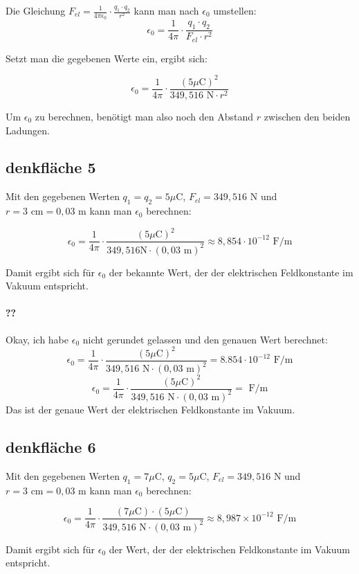 \documentclass{report}
\begin{document}
Die Gleichung $F_{el}=\frac{1}{4\pi\epsilon_0} \cdot \frac{q_1 \cdot q_2}{r^2}$
kann man nach $\epsilon_0$ umstellen:
$$\epsilon_0 = \frac{1}{4\pi}\cdot \frac{q_1 \cdot q_2}{F_{el}\cdot r^2}$$

Setzt man die gegebenen Werte ein, ergibt sich:

$$\epsilon_0 = \frac{1}{4\pi}\cdot \frac{(5\mu\text{C})^2}{349,516\text{ N}\cdot r^2}$$

Um $\epsilon_0$ zu berechnen, benötigt man also noch den Abstand $r$ zwischen den beiden Ladungen.

\subsection{denkfläche 5}
Mit den gegebenen Werten $q_1=q_2=5\mu\text{C}$, $F_{el}=349,516\text{ N}$ und
$r=3\text{ cm}=0,03\text{ m}$ kann man $\epsilon_0$ berechnen:

$$\epsilon_0 = \frac{1}{4\pi}\cdot \frac{(5\mu\text{C})^2}{349,516\text{
N}\cdot (0,03\text{ m})^2} \approx 8,854\cdot 10^{-12} \text{ F/m}$$

Damit ergibt sich für $\epsilon_0$ der bekannte Wert, der der elektrischen
Feldkonstante im Vakuum entspricht.

\paragraph{??} %

Okay, ich habe $\epsilon_0$ nicht gerundet gelassen und den genauen Wert
berechnet:
$$\epsilon_0 = \frac{1}{4\pi}\cdot \frac{(5\mu\text{C})^2}{349,516\text{ N}\cdot (0,03\text{ m})^2} = 8.854\cdot 10^{-12} \text{ F/m}$$
$$\epsilon_0 = \frac{1}{4\pi}\cdot \frac{(5\mu\text{C})^2}{349,516\text{ N}\cdot (0,03\text{ m})^2} =  \text{ F/m}$$
Das ist der genaue Wert der elektrischen Feldkonstante im Vakuum.

\subsection{denkfläche 6}
Mit den gegebenen Werten $q_1=7\mu\text{C}$, $q_2=5\mu\text{C}$,
$F_{el}=349,516\text{ N}$ und $r=3\text{ cm}=0,03\text{ m}$ kann man
$\epsilon_0$ berechnen:

$$\epsilon_0 = \frac{1}{4\pi}\cdot \frac{(7\mu\text{C}) \cdot
(5\mu\text{C})}{349,516\text{ N}\cdot (0,03\text{ m})^2} \approx 8,987\times
10^{-12} \text{ F/m}$$

Damit ergibt sich für $\epsilon_0$ der Wert, der der elektrischen Feldkonstante
im Vakuum entspricht.
\end{document}
